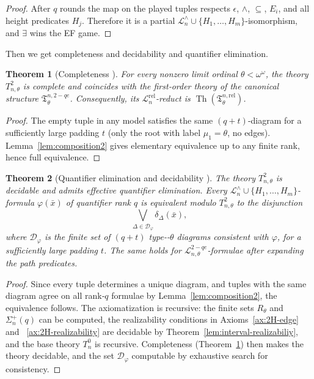 \documentclass{amsart}
\newtheorem{theorem}{Theorem}
\theoremstyle{definition}
\begin{document}
\begin{proof}
    After $q$ rounds the map on the played tuples respects $\epsilon$, $\wedge$, $\subseteq$, $E_i$, and all height predicates $H_j$.  Therefore it is a partial $\mathcal L_n^\wedge\cup\{H_1,\dots,H_m\}$-isomorphism, and $\exists$ wins the EF game. 
\end{proof}

Then we get completeness and decidability and quantifier elimination.

\begin{theorem}[Completeness \MakeUppercase{}]\label{thm:tree-completeness2}
    For every nonzero limit ordinal $\theta<\omega^\omega$, the theory $T_{n,\theta}^2$ is complete and coincides with the first‑order theory of the canonical structure $\mathfrak T_{\theta}^{n,2-qe}$. Consequently, its $\mathcal L_n^{\mathrm{rel}}$-reduct is $\operatorname{Th}(\mathfrak T_{\theta}^{n,\mathrm{rel}})$.
\end{theorem}
\begin{proof}
    The empty tuple in any model satisfies the same $(q+t)$-diagram for a sufficiently large padding $t$ (only the root with label $\mu_1=\theta$, no edges).  Lemma~\ref{lem:composition2} gives elementary equivalence up to any finite rank, hence full equivalence.
\end{proof}

\begin{theorem}[Quantifier elimination and decidability \MakeUppercase{}]\label{thm:2-qe}
    The theory $T_{n,\theta}^2$ is decidable and admits effective quantifier elimination.  Every $\mathcal L_n^\wedge\cup\{H_1,\dots,H_m\}$-formula $\varphi(\bar x)$ of quantifier rank $q$ is equivalent modulo $T_{n,\theta}^2$ to the disjunction 
    $$\bigvee_{\Delta\in\mathcal D_\varphi}\delta_\Delta(\bar x),$$
    where $\mathcal D_\varphi$ is the finite set of $(q+t)$ type-{\MakeUppercase{}}-$\theta$ diagrams consistent with $\varphi$, for a sufficiently large padding $t$.  The same holds for $\mathcal L_{n,\theta}^{2-qe}$-formulae after expanding the path predicates.
\end{theorem}
\begin{proof}
    Since every tuple determines a unique diagram, and tuples with the same diagram agree on all rank‑$q$ formulae by Lemma~\ref{lem:composition2}, the equivalence follows. The axiomatization is recursive: the finite sets $R_\theta$ and $\Sigma_n^+(q)$ can be computed, the realizability conditions in Axioms~\ref{ax:2H-edge} and ~\ref{ax:2H-realizability} are decidable by Theorem~\ref{lem:interval-realizabiliy}, and the base theory $T_n^0$ is recursive. Completeness (Theorem~\ref{thm:tree-completeness2}) then makes the theory decidable, and the set $\mathcal D_\varphi$ computable by exhaustive search for consistency.
\end{proof}
\end{document}
